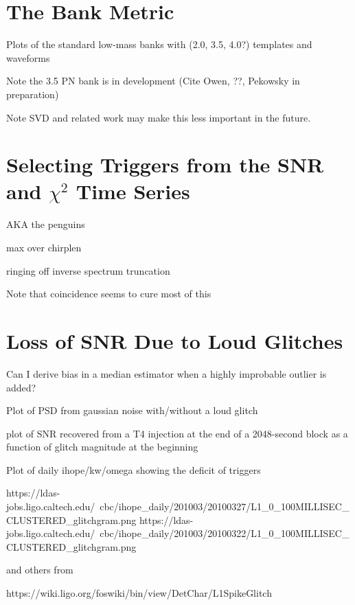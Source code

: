 \section{The Bank Metric}

Plots of the standard low-mass banks with (2.0, 3.5, 4.0?) templates
and waveforms

Note the 3.5 PN bank is in development (Cite Owen, ??, Pekowsky in
preparation)

Note SVD and related work may make this less important in the future.


\section{Selecting Triggers from the SNR and $\chi^2$ Time Series}

AKA the penguins

max over chirplen

ringing off inverse spectrum truncation

Note that coincidence seems to cure most of this


\section{Loss of SNR Due to Loud Glitches}

Can I derive bias in a median estimator when a highly improbable
outlier is added?

Plot of PSD from gaussian noise with/without a loud glitch

plot of SNR recovered from a T4 injection at the end of a 2048-second
block as a function of glitch magnitude at the beginning

Plot of daily ihope/kw/omega showing the deficit of triggers


https://ldas-jobs.ligo.caltech.edu/~cbc/ihope_daily/201003/20100327/L1_0_100MILLISEC_CLUSTERED_glitchgram.png
https://ldas-jobs.ligo.caltech.edu/~cbc/ihope_daily/201003/20100322/L1_0_100MILLISEC_CLUSTERED_glitchgram.png

and others from

https://wiki.ligo.org/foswiki/bin/view/DetChar/L1SpikeGlitch

